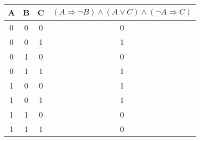 \begin{tabular}{|c|c|c|c|}
  \hline
  A & B & C & $ (A \Rightarrow \lnot B) \land (A \lor C) \land (\lnot A \Rightarrow C) $ \\ \hline
  0 & 0 & 0 & 0                                                                          \\ \hline
  0 & 0 & 1 & 1                                                                          \\ \hline
  0 & 1 & 0 & 0                                                                          \\ \hline
  0 & 1 & 1 & 1                                                                          \\ \hline
  1 & 0 & 0 & 1                                                                          \\ \hline
  1 & 0 & 1 & 1                                                                          \\ \hline
  1 & 1 & 0 & 0                                                                          \\ \hline
  1 & 1 & 1 & 0                                                                          \\ \hline
\end{tabular}



















